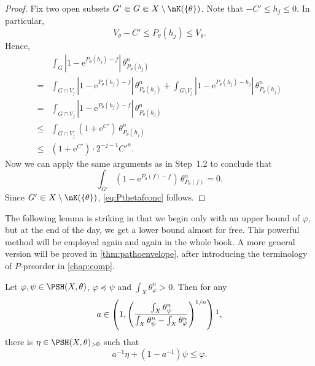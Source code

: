 \begin{proof}
    Fix two open subsets $G'\Subset G\Subset X\setminus \nK(\{\theta\})$. Note that $-C'\leq h_j\leq 0$. In particular,
    \[
    V_{\theta}-C'\leq P_{\theta}(h_j)\leq V_{\theta}.
    \]
    Hence,
    \[
    \begin{aligned}
        &\int_G \left| 1-\mathrm{e}^{P_{\theta}(h_j)-f}\right|\,\theta_{P_{\theta}(h_j)}^n\\
        =&\int_{G\cap V_j} \left|1-\mathrm{e}^{P_{\theta}(h_j)-f}\right|\,\theta_{P_{\theta}(h_j)}^n+\int_{G\setminus V_j} \left|1-\mathrm{e}^{P_{\theta}(h_j)-h_j}\right|\,\theta_{P_{\theta}(h_j)}^n\\
        =& \int_{G\cap V_j} \left|1-\mathrm{e}^{P_{\theta}(h_j)-f}\right|\,\theta_{P_{\theta}(h_j)}^n\\
        \leq & \int_{G\cap V_j} \left( 1+\mathrm{e}^{C'}\right)\,\theta_{P_{\theta}(h_j)}^n\\
        \leq & \left( 1+\mathrm{e}^{C'}\right) \cdot 2^{-j-1} C'^n.
    \end{aligned}
    \]
    Now we can apply the same arguments as in Step~1.2 to conclude that
    \[
    \int_{G'}\left(1-\mathrm{e}^{P_{\theta}(f)-f}\right)\,\theta_{P_{\theta}(f)}^n=0.
    \]
    Since $G'\Subset X\setminus \nK(\{\theta\})$, \eqref{eq:Pthetafconc} follows.
\end{proof}



The following lemma is striking in that we begin only with an upper bound of $\varphi$, but at the end of the day, we get a lower bound almost for free. This powerful method will be employed again and again in the whole book. A more general version will be proved in \cref{thm:pathoenvelope}, after introducing the terminology of $P$-preorder in \cref{chap:comp}.
\begin{lemma}\label{lma:pathoenvelope}
    Let $\varphi,\psi\in \PSH(X,\theta)$, $\varphi\preceq \psi$ and $\int_X \theta_{\varphi}^n>0$. Then for any
    \begin{equation}\label{eq:arangetemp}
    a\in \left( 1, \left(\frac{\int_X \theta_{\psi}^n}{\int_X \theta_{\psi}^n-\int_X \theta_{\varphi}^n}\right)^{1/n} \right)\footnotemark,
    \end{equation}
    there is $\eta\in \PSH(X,\theta)_{>0}$ such that
    \begin{equation}\label{eq:path_env}
        a^{-1}\eta+\left(1-a^{-1}\right)\psi\leq \varphi.
    \end{equation}
\end{lemma}

